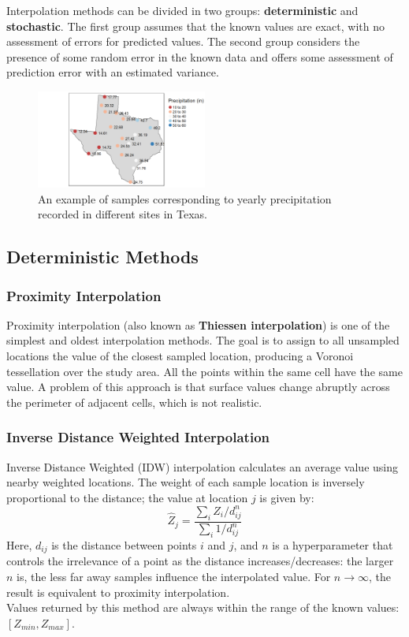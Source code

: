 Interpolation methods can be divided in two groups: \textbf{deterministic} and \textbf{stochastic}. The first group assumes that the known values are exact, with no assessment of errors for predicted values. The second group considers the presence of some random error in the known data and offers some assessment of prediction error with an estimated variance.
\begin{figure}[!ht]
    \centering
    \includegraphics[width=0.5\textwidth]{img/interpolation_original.png}
    \caption{An example of samples corresponding to yearly precipitation recorded in different sites in Texas.}
    \label{fig:interpolation_original}
\end{figure}

\subsection{Deterministic Methods}

\subsubsection{Proximity Interpolation}

Proximity interpolation (also known as \textbf{Thiessen interpolation}) is one of the simplest and oldest interpolation methods. The goal is to assign to all unsampled locations the value of the closest sampled location, producing a Voronoi tessellation over the study area. All the points within the same cell have the same value. A problem of this approach is that surface values change abruptly across the perimeter of adjacent cells, which is not realistic.

\subsubsection{Inverse Distance Weighted Interpolation}

Inverse Distance Weighted (IDW) interpolation calculates an average value using nearby weighted locations. The weight of each sample location is inversely proportional to the distance; the value at location $j$ is given by:
\begin{equation*}
    \hat{Z}_j = \frac{\sum_i Z_i / d_{ij}^n}{\sum_i 1 / d_{ij}^n}
\end{equation*}
Here, $d_{ij}$ is the distance between points $i$ and $j$, and $n$ is a hyperparameter that controls the irrelevance of a point as the distance increases/decreases: the larger $n$ is, the less far away samples influence the interpolated value. For $n \rightarrow \infty$, the result is equivalent to proximity interpolation. \\
Values returned by this method are always within the range of the known values: $[Z_{min}, Z_{max}]$.

